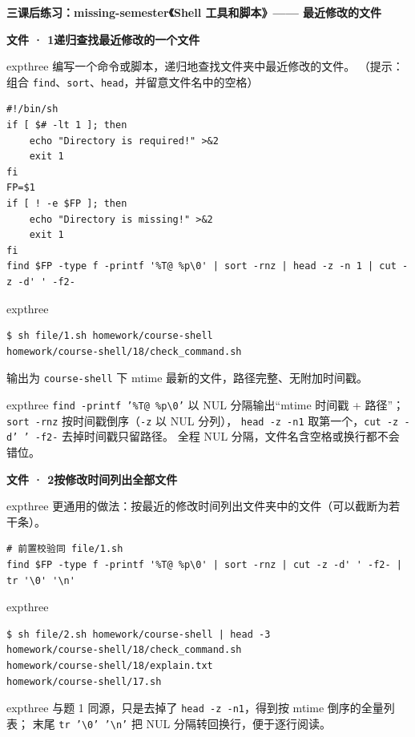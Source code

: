 \documentclass[11pt,a4paper,fontset=none]{ctexart}
\newcommand{\partbanner}[3]{%
  \par\vspace{1.6em}
  \begin{tcolorbox}[enhanced, colback=#1!10, colframe=#1!85!black,
    boxrule=1pt, arc=3pt, left=8pt, right=8pt, top=6pt, bottom=6pt,
    before skip=1.6em]
    {\Large\bfseries\color{#1!70!black}#2\qquad #3}
  \end{tcolorbox}
  \par\vspace{0.2em}\noindent\ignorespaces
}
\newcommand{\hwbanner}[3]{%
  \par\vspace{1.1em}
  \begin{tcolorbox}[enhanced, colback=#1!8, colframe=#1!75!black,
    boxrule=0.8pt, arc=2pt, left=7pt, right=7pt, top=4pt, bottom=4pt,
    before skip=1.1em]
    {\bfseries\color{#1!75!black}#2\qquad #3}
  \end{tcolorbox}
  \par\vspace{0.1em}\noindent\ignorespaces
}
\newcommand{\sublabel}[2]{%
  \par\vspace{0.8em}\noindent{\bfseries\color{#1!75!black}#2}\par\nobreak\vspace{0.25em}\noindent\ignorespaces
}
\begin{document}
\partbanner{expthree}{三}{课后练习：missing-semester《Shell 工具和脚本》—— 最近修改的文件}

\hwbanner{expthree}{文件 · 1}{递归查找最近修改的一个文件}
\begin{reqbox}{expthree}
  编写一个命令或脚本，递归地查找文件夹中最近修改的文件。
  （提示：组合 \texttt{find}、\texttt{sort}、\texttt{head}，并留意文件名中的空格）
\end{reqbox}
\sublabel{expthree}{\faCode\ 解答（\texttt{file/1.sh}）}
\begin{lstlisting}[style=shell]
#!/bin/sh
if [ $# -lt 1 ]; then
	echo "Directory is required!" >&2
	exit 1
fi
FP=$1
if [ ! -e $FP ]; then
	echo "Directory is missing!" >&2
	exit 1
fi
find $FP -type f -printf '%T@ %p\0' | sort -rnz | head -z -n 1 | cut -z -d' ' -f2-
\end{lstlisting}
\begin{resbox}{expthree}
\begin{lstlisting}[style=output]
$ sh file/1.sh homework/course-shell
homework/course-shell/18/check_command.sh
\end{lstlisting}
输出为 \texttt{course-shell} 下 mtime 最新的文件，路径完整、无附加时间戳。
\end{resbox}
\begin{trapbox}{expthree}
  \texttt{find -printf '\%T@ \%p\textbackslash0'} 以 NUL 分隔输出“mtime 时间戳 + 路径”；
  \texttt{sort -rnz} 按时间戳倒序（\texttt{-z} 以 NUL 分列），
  \texttt{head -z -n1} 取第一个，\texttt{cut -z -d' ' -f2-} 去掉时间戳只留路径。
  全程 NUL 分隔，文件名含空格或换行都不会错位。
\end{trapbox}

\hwbanner{expthree}{文件 · 2}{按修改时间列出全部文件}
\begin{reqbox}{expthree}
  更通用的做法：按最近的修改时间列出文件夹中的文件（可以截断为若干条）。
\end{reqbox}
\sublabel{expthree}{\faCode\ 解答（\texttt{file/2.sh}）}
\begin{lstlisting}[style=shell]
# 前置校验同 file/1.sh
find $FP -type f -printf '%T@ %p\0' | sort -rnz | cut -z -d' ' -f2- | tr '\0' '\n'
\end{lstlisting}
\begin{resbox}{expthree}
\begin{lstlisting}[style=output]
$ sh file/2.sh homework/course-shell | head -3
homework/course-shell/18/check_command.sh
homework/course-shell/18/explain.txt
homework/course-shell/17.sh
\end{lstlisting}
\end{resbox}
\begin{trapbox}{expthree}
  与题 1 同源，只是去掉了 \texttt{head -z -n1}，得到按 mtime 倒序的全量列表；
  末尾 \texttt{tr '\textbackslash0' '\textbackslash n'} 把 NUL 分隔转回换行，便于逐行阅读。
\end{trapbox}
\end{document}
